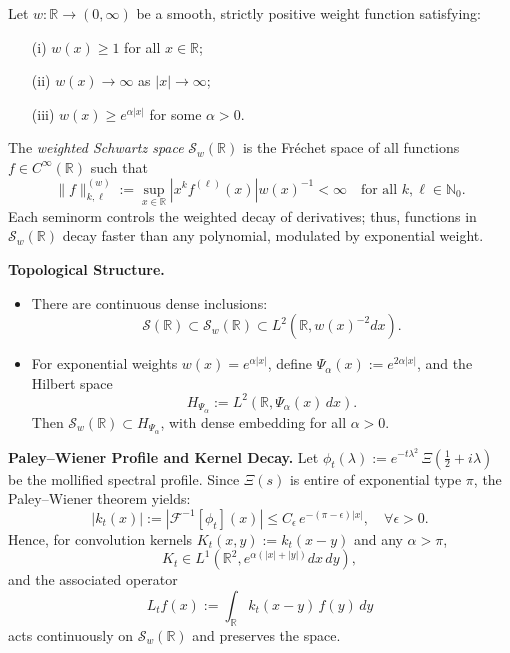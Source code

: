 \begin{definition}\label{def:weighted_schwartz_space}
Let \( w \colon \mathbb{R} \to (0, \infty) \) be a smooth, strictly positive weight function satisfying:
\begin{enumerate}
    \item[\textup{(i)}] \( w(x) \ge 1 \) for all \( x \in \mathbb{R} \);
    \item[\textup{(ii)}] \( w(x) \to \infty \) as \( |x| \to \infty \);
    \item[\textup{(iii)}] \( w(x) \ge e^{\alpha |x|} \) for some \( \alpha > 0 \).
\end{enumerate}

The \emph{weighted Schwartz space} \( \mathcal{S}_w(\mathbb{R}) \) is the Fréchet space of all functions \( f \in C^\infty(\mathbb{R}) \) such that
\[
\| f \|^{(w)}_{k,\ell} := \sup_{x \in \mathbb{R}} \left| x^k f^{(\ell)}(x) \right| w(x)^{-1} < \infty \quad \text{for all } k,\ell \in \mathbb{N}_0.
\]
Each seminorm controls the weighted decay of derivatives; thus, functions in \( \mathcal{S}_w(\mathbb{R}) \) decay faster than any polynomial, modulated by exponential weight.

\medskip
\noindent\textbf{Topological Structure.}
\begin{itemize}
    \item There are continuous dense inclusions:
    \[
    \mathcal{S}(\mathbb{R}) \subset \mathcal{S}_w(\mathbb{R}) \subset L^2(\mathbb{R}, w(x)^{-2} dx).
    \]
    \item For exponential weights \( w(x) = e^{\alpha |x|} \), define \( \Psi_\alpha(x) := e^{2\alpha |x|} \), and the Hilbert space
    \[
    H_{\Psi_\alpha} := L^2(\mathbb{R}, \Psi_\alpha(x)\, dx).
    \]
    Then \( \mathcal{S}_w(\mathbb{R}) \subset H_{\Psi_\alpha} \), with dense embedding for all \( \alpha > 0 \).
\end{itemize}

\medskip
\noindent\textbf{Paley--Wiener Profile and Kernel Decay.}
Let \( \phi_t(\lambda) := e^{-t\lambda^2} \, \Xi\left( \tfrac{1}{2} + i\lambda \right) \) be the mollified spectral profile. Since \( \Xi(s) \) is entire of exponential type \( \pi \), the Paley--Wiener theorem yields:
\[
|k_t(x)| := \left| \mathcal{F}^{-1}[\phi_t](x) \right| \le C_\epsilon \, e^{-(\pi - \epsilon)|x|}, \quad \forall \epsilon > 0.
\]
Hence, for convolution kernels \( K_t(x,y) := k_t(x - y) \) and any \( \alpha > \pi \),
\[
K_t \in L^1(\mathbb{R}^2, e^{\alpha(|x| + |y|)} dx\,dy),
\]
and the associated operator
\[
L_t f(x) := \int_{\mathbb{R}} k_t(x - y)\, f(y)\, dy
\]
acts continuously on \( \mathcal{S}_w(\mathbb{R}) \) and preserves the space.


\end{definition}

